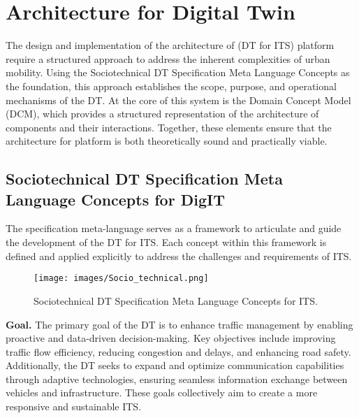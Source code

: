 \section{Architecture for Digital Twin}
\label{sec:architecture}
The design and implementation of the architecture of \digit (DT for ITS) platform require a structured approach to address the inherent complexities of urban mobility. Using the Sociotechnical DT Specification Meta Language Concepts \cite{balbir} as the foundation, this approach establishes the scope, purpose, and operational mechanisms of the DT. At the core of this system is the Domain Concept Model (DCM), which provides a structured representation of the architecture of \digit components and their interactions. Together, these elements ensure that the architecture for \digit platform is both theoretically sound and practically viable. 

\subsection{Sociotechnical DT Specification Meta Language Concepts for DigIT}

The specification meta-language serves as a framework to articulate and guide the development of the DT for ITS. Each concept within this framework is defined and applied explicitly to address the challenges and requirements of ITS.

\begin{figure*}[!htbp]
    \centering
    \texttt{[image: images/Socio\_technical.png]}
    \caption{Sociotechnical DT Specification Meta Language Concepts for ITS.}
    \label{fig:dcm_uml}
\end{figure*}


\textbf{Goal.} The primary goal of the DT is to enhance traffic management by enabling proactive and data-driven decision-making. Key objectives include improving traffic flow efficiency, reducing congestion and delays, and enhancing road safety. Additionally, the DT seeks to expand and optimize communication capabilities through adaptive technologies, ensuring seamless information exchange between vehicles and infrastructure. These goals collectively aim to create a more responsive and sustainable ITS. 

